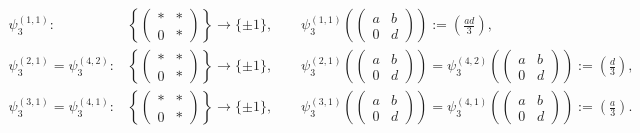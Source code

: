 \[
\begin{split}
\psi_3^{(1,1)} : &\left\{ \begin{pmatrix} * & * \\ 0 & * \end{pmatrix} \right\} \longrightarrow \{ \pm 1 \}, \quad\quad \psi_3^{(1,1)}\left( \begin{pmatrix} a & b \\ 0 & d \end{pmatrix} \right) := \left( \frac{ad}{3} \right), \\
\psi_3^{(2,1)} = \psi_3^{(4,2)} : &\left\{ \begin{pmatrix} * & * \\ 0 & * \end{pmatrix} \right\} \longrightarrow \{ \pm 1 \}, \quad\quad \psi_3^{(2,1)}\left( \begin{pmatrix} a & b \\ 0 & d \end{pmatrix} \right) = \psi_3^{(4,2)}\left( \begin{pmatrix} a & b \\ 0 & d \end{pmatrix} \right) := \left( \frac{d}{3} \right), \\
\psi_3^{(3,1)} = \psi_3^{(4,1)} : &\left\{ \begin{pmatrix} * & * \\ 0 & * \end{pmatrix} \right\} \longrightarrow \{ \pm 1 \}, \quad\quad \psi_3^{(3,1)}\left( \begin{pmatrix} a & b \\ 0 & d \end{pmatrix} \right) = \psi_3^{(4,1)} \left( \begin{pmatrix} a & b \\ 0 & d \end{pmatrix} \right):= \left( \frac{a}{3} \right).
\end{split}
\]
